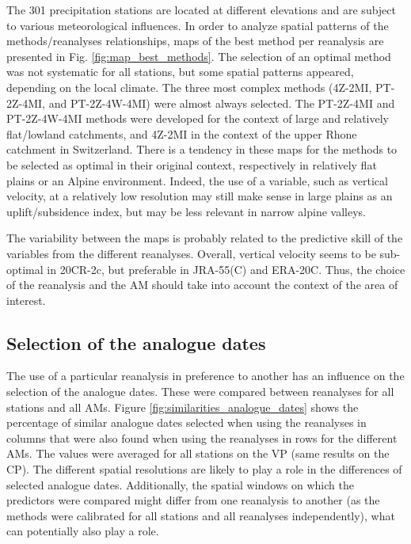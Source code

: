 \documentclass[smallextended]{svjour3}       %
\begin{document}
	The 301 precipitation stations are located at different elevations and are subject to various meteorological influences. In order to analyze spatial patterns of the methods/reanalyses relationships, maps of the best method per reanalysis are presented in Fig. \ref{fig:map_best_methods}. The selection of an optimal method was not systematic for all stations, but some spatial patterns appeared, depending on the local climate. The three most complex methods (4Z-2MI, PT-2Z-4MI, and PT-2Z-4W-4MI) were almost always selected. The PT-2Z-4MI and PT-2Z-4W-4MI methods were developed for the context of large and relatively flat/lowland catchments, and 4Z-2MI in the context of the upper Rhone catchment in Switzerland. There is a tendency in these maps for the methods to be selected as optimal in their original context, respectively in relatively flat plains or an Alpine environment. Indeed, the use of a variable, such as vertical velocity, at a relatively low resolution may still make sense in large plains as an uplift/subsidence index, but may be less relevant in narrow alpine valleys.
	
	The variability between the maps is probably related to the predictive skill of the variables from the different reanalyses. Overall, vertical velocity seems to be sub-optimal in 20CR-2c, but preferable in JRA-55(C) and ERA-20C. Thus, the choice of the reanalysis and the AM should take into account the context of the area of interest.
	
	
	\subsection{Selection of the analogue dates}
	
	The use of a particular reanalysis in preference to another has an influence on the selection of the analogue dates. These were compared between reanalyses for all stations and all AMs. Figure \ref{fig:similarities_analogue_dates} shows the percentage of similar analogue dates selected when using the reanalyses in columns that were also found when using the reanalyses in rows for the different AMs. The values were averaged for all stations on the VP (same results on the CP). The different spatial resolutions are likely to play a role in the differences of selected analogue dates. Additionally, the spatial windows on which the predictors were compared might differ from one reanalysis to another (as the methods were calibrated for all stations and all reanalyses independently), what can potentially also play a role.
	
\end{document}
